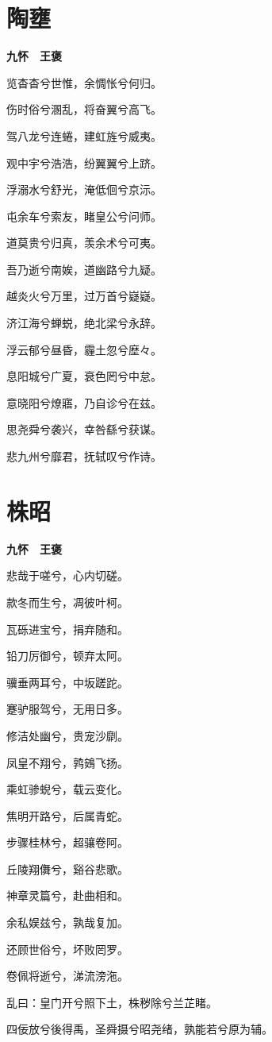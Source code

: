 \documentclass[12pt,a4paper]{ctexbook}
\begin{document}
\section{陶壅}
\textbf{九怀　王褒}\par\vspace{0.5em}
览杳杳兮世惟，余惆怅兮何归。\par
伤时俗兮溷乱，将奋翼兮高飞。\par
驾八龙兮连蜷，建虹旌兮威夷。\par
观中宇兮浩浩，纷翼翼兮上跻。\par
浮溺水兮舒光，淹低佪兮京沶。\par
屯余车兮索友，睹皇公兮问师。\par
道莫贵兮归真，羡余术兮可夷。\par
吾乃逝兮南娭，道幽路兮九疑。\par
越炎火兮万里，过万首兮嶷嶷。\par
济江海兮蝉蜕，绝北梁兮永辞。\par
浮云郁兮昼昏，霾土忽兮塺々。\par
息阳城兮广夏，衰色罔兮中怠。\par
意晓阳兮燎寤，乃自诊兮在兹。\par
思尧舜兮袭兴，幸咎繇兮获谋。\par
悲九州兮靡君，抚轼叹兮作诗。\par

\section{株昭}
\textbf{九怀　王褒}\par\vspace{0.5em}
悲哉于嗟兮，心内切磋。\par
款冬而生兮，凋彼叶柯。\par
瓦砾进宝兮，捐弃随和。\par
铅刀厉御兮，顿弃太阿。\par
骥垂两耳兮，中坂蹉跎。\par
蹇驴服驾兮，无用日多。\par
修洁处幽兮，贵宠沙劘。\par
凤皇不翔兮，鹑鴳飞扬。\par
乘虹骖蜺兮，载云变化。\par
焦明开路兮，后属青蛇。\par
步骤桂林兮，超骧卷阿。\par
丘陵翔儛兮，谿谷悲歌。\par
神章灵篇兮，赴曲相和。\par
余私娱兹兮，孰哉复加。\par
还顾世俗兮，坏败罔罗。\par
卷佩将逝兮，涕流滂沲。\par
乱曰：皇门开兮照下土，株秽除兮兰芷睹。\par
四佞放兮後得禹，圣舜摄兮昭尧绪，孰能若兮原为辅。\par
\end{document}
